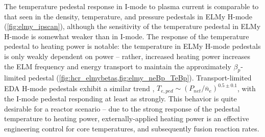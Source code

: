 The temperature pedestal response in I-mode to plasma current is comparable to that seen in the density, temperature, and pressure pedestals in ELMy H-mode (\cf \cref{fig:elmy_ipscan}), although the sensitivity of the temperature pedestal in ELMy H-mode is somewhat weaker than in I-mode.  The response of the temperature pedestal to heating power is notable: the temperature in ELMy H-mode pedestals is only weakly dependent on power -- rather, increased heating power increases the ELM frequency and energy transport to maintain the approximately $\beta_p$-limited pedestal (\cf \cref{fig:hcr_elmybetas,fig:elmy_neBp_TeBp}).  Transport-limited EDA H-mode pedestals exhibit a similar trend \cite{Hubbard2001}, $T_{e,ped} \sim \left(P_{net}/\overline{n}_e\right)^{0.5 \pm 0.1}$, with the I-mode pedestal responding at least as strongly.  This behavior is quite desirable for a reactor scenario -- due to the strong response of the pedestal temperature to heating power, externally-applied heating power is an effective engineering control for core temperatures, and subsequently fusion reaction rates.  

\begin{figure}
 \pushtooutside
\end{figure}

